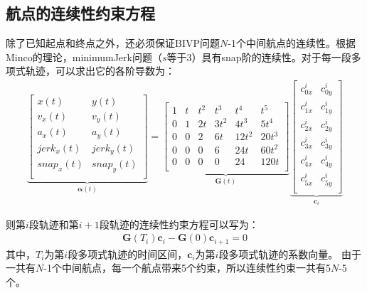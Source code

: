 \documentclass[master,academic]{ysuthesis} %
\begin{document}
		\subsection{航点的连续性约束方程} 
		除了已知起点和终点之外，还必须保证BIVP问题$N$-1个中间航点的连续性。根据Minco的理论，minimumJerk问题（$s$等于3）具有snap阶的连续性。对于每一段多项式轨迹，可以求出它的各阶导数为：
		\begin{equation}
			\begin{aligned}
				\underbrace{\begin{bmatrix}
					x(t)& y(t)\\
					v_x(t)& v_y(t)\\
					a_x(t)& a_y(t)\\
					jerk_x(t)& jerk_y(t)\\
					snap_x(t)& snap_y(t)\\
				\end{bmatrix}}_{\bm{\alpha}(t) }
					= \underbrace{\begin{bmatrix}
						1&		t&		t^2&		t^3&		t^4&		t^5\\
						0&		1&		2t&		3t^2&		4t^3&		5t^4\\
						0&		0&		2&		6t&		12t^2&		20t^3\\
						0&		0&		0&		6&		24t&		60t^2\\
						0&		0&		0&		0&		24&		120t\\
					\end{bmatrix}}_{\bm{G}(t)}
					  \underbrace{\begin{bmatrix}
						c_{0x}^{i}&		c_{0y}^{i}\\
						c_{1x}^{i}&		c_{1y}^{i}\\
						c_{2x}^{i}&		c_{2y}^{i}\\
						c_{3x}^{i}&		c_{3y}^{i}\\
						c_{4x}^{i}&		c_{4y}^{i}\\
						c_{5x}^{i}&		c_{5y}^{i}\\
					\end{bmatrix}}_{\bm{c}_i}
			\end{aligned}
		\end{equation}
		
		则第$i$段轨迹和第$i+1$段轨迹的连续性约束方程可以写为：
		\begin{equation}
			\begin{aligned}
				\bm{G}(T_i)\bm{c}_i-\bm{G}(0)\bm{c}_{i+1} = 0
			\end{aligned}
		\end{equation}
		其中，$T_i$为第$i$段多项式轨迹的时间区间，$\bm{c}_i$为第$i$段多项式轨迹的系数向量。
		由于一共有$N$-1个中间航点，每一个航点带来5个约束，所以连续性约束一共有5$N$-5个。
		
\end{document}
